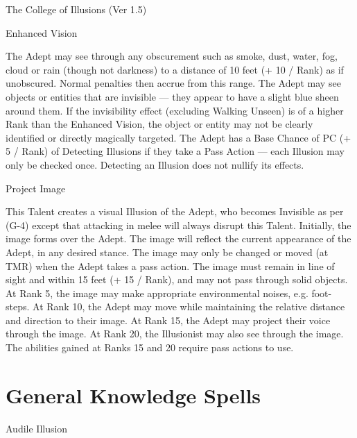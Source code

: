 \begin{Chapter}{The College of Illusions (Ver 1.5)}
\begin{talent}[T-2]{Enhanced Vision }
\begin{effects}
 The  Adept  may  see  through  any  obscurement such as smoke, dust, water, fog, cloud or rain 
(though not darkness) to a distance of 10 feet (+ 10 
/  Rank)  as  if  unobscured.  Normal  penalties  then 
accrue from this range. The Adept may see objects 
or entities that are invisible — they appear to have 
a  slight blue  sheen  around  them.  If  the  invisibility 
effect  (excluding  Walking  Unseen)  is  of  a  higher 
Rank  than  the  Enhanced  Vision,  the  object  or  entity may not be clearly identified or directly magically targeted. The Adept has a Base Chance of PC 
(+  5  /  Rank)  of  Detecting  Illusions  if  they  take  a 
Pass Action — each Illusion may only be checked 
once.  Detecting  an  Illusion  does  not  nullify  its 
effects. 

\end{effects}
\end{talent}

\begin{talent}[T-3]{Project Image }

\begin{effects}
This Talent creates a visual Illusion of the 
Adept, who becomes  Invisible as per (G-4) except 
that  attacking  in  melee  will  always  disrupt  this 
Talent.  Initially,  the  image  forms  over  the  Adept. 
The  image  will  reflect  the  current  appearance  of 
the  Adept,  in  any  desired  stance.  The  image  may 
only  be  changed  or  moved  (at  TMR)  when  the 
Adept takes a pass action. The image must remain 
in  line  of  sight  and  within  15  feet  (+  15  /  Rank), 
and may not pass through solid objects. At Rank 5, 
the  image  may  make  appropriate  environmental 
noises, e.g. foot-steps. At Rank 10, the Adept may 
move  while  maintaining  the  relative  distance  and 
direction  to  their  image.  At  Rank  15,  the  Adept 
may project their voice through the image. At Rank 
20, the Illusionist may also see through the image. 
The  abilities  gained  at  Ranks  15  and  20  require 
pass actions to use. 

\end{effects}
\end{talent}

\section{General Knowledge Spells}

\begin{spell}[G-1]{Audile Illusion }


\end{spell}
\end{Chapter}

